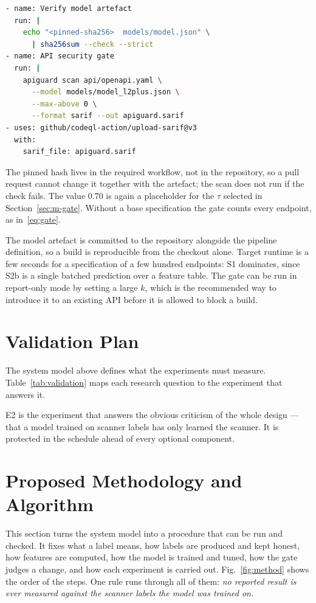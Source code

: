 \documentclass[conference]{IEEEtran}
\begin{document}
\begin{lstlisting}[language=bash]
- name: Verify model artefact
  run: |
    echo "<pinned-sha256>  models/model.json" \
      | sha256sum --check --strict
- name: API security gate
  run: |
    apiguard scan api/openapi.yaml \
      --model models/model_l2plus.json \
      --max-above 0 \
      --format sarif --out apiguard.sarif
- uses: github/codeql-action/upload-sarif@v3
  with:
    sarif_file: apiguard.sarif
\end{lstlisting}

The pinned hash lives in the required workflow, not in the repository, so a pull request
cannot change it together with the artefact; the scan does not run if the check fails. The
value 0.70 is again a placeholder for the $\tau$ selected in Section~\ref{sec:m-gate}.
Without a base specification the gate counts every endpoint, as in~\eqref{eq:gate}.

The model artefact is committed to the repository alongside the pipeline definition, so a
build is reproducible from the checkout alone. Target runtime is a few seconds for a
specification of a few hundred endpoints: S1 dominates, since S2b is a single batched
prediction over a feature table. The gate can be run in report-only mode by setting a large
$k$, which is the recommended way to introduce it to an existing API before it is allowed to
block a build.

\section{Validation Plan}
The system model above defines what the experiments must measure.
Table~\ref{tab:validation} maps each research question to the experiment that answers it.

E2 is the experiment that answers the obvious criticism of the whole design --- that a model
trained on scanner labels has only learned the scanner. It is protected in the schedule ahead of
every optional component.


\section{Proposed Methodology and Algorithm}
\label{sec:method}
This section turns the system model into a procedure that can be run and checked. It fixes
what a label means, how labels are produced and kept honest, how features are computed, how
the model is trained and tuned, how the gate judges a change, and how each experiment is
carried out. Fig.~\ref{fig:method} shows the order of the steps. One rule runs through all of
them: \emph{no reported result is ever measured against the scanner labels the model was trained on.}
\end{document}
